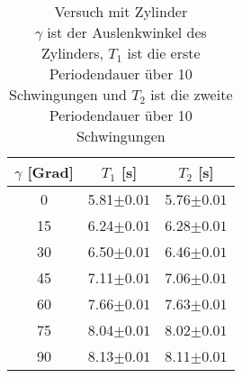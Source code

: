 \begin{table}[H]
    \centering
    	\caption[Versuch mit Zylinder]{Versuch mit Zylinder\\
    		$\gamma$ ist der Auslenkwinkel des Zylinders, $ T_{1} $ ist die erste Periodendauer über 10 Schwingungen und $ T_{2} $ ist die zweite Periodendauer über 10 Schwingungen}
    	\begin{tabular}{|c|c|c|}
    		\hline
    		$\gamma$ [Grad] & $ T_{1} $ [s] & $ T_{2} $ [s] \\
    		\hline
    		0& 5.81$ \pm0.01 $  & 5.76$ \pm0.01 $  \\
    		\hline
    		15& 6.24$ \pm0.01 $ & 6.28$ \pm0.01 $  \\
    		\hline
    		30& 6.50$ \pm0.01 $  & 6.46$ \pm0.01 $  \\
    		\hline
    		45& 7.11$ \pm0.01 $  &7.06$ \pm0.01 $   \\
    		\hline
    		60& 7.66$ \pm0.01 $  &  7.63$ \pm0.01 $ \\
    		\hline
    		75	& 8.04$ \pm0.01 $  &  8.02$ \pm0.01 $ \\
    		\hline
    		90& 8.13$ \pm0.01 $  & 8.11$ \pm0.01 $  \\
    		\hline
    	\end{tabular}
    	\label{Tab: sin}
\end{table}